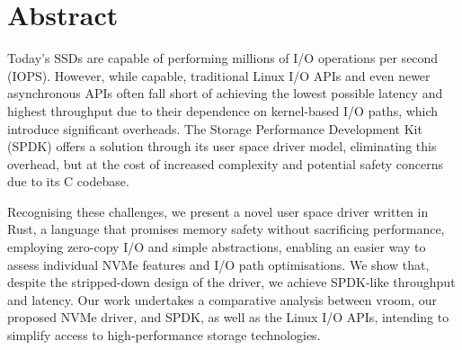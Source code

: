 \chapter{Abstract}
Today's SSDs are capable of performing millions of I/O operations per second (IOPS). However, while capable, traditional Linux I/O APIs and even newer asynchronous APIs often fall short of achieving the lowest possible latency and highest throughput due to their dependence on kernel-based I/O paths, which introduce significant overheads. The Storage Performance Development Kit (SPDK) offers a solution through its user space driver model, eliminating this overhead, but at the cost of increased complexity and potential safety concerns due to its C codebase.

Recognising these challenges, we present a novel user space driver written in Rust, a language that promises memory safety without sacrificing performance, employing zero-copy I/O and simple abstractions, enabling an easier way to assess individual NVMe features and I/O path optimisations. We show that, despite the stripped-down design of the driver, we achieve SPDK-like throughput and latency. Our work undertakes a comparative analysis between vroom, our proposed NVMe driver, and SPDK, as well as the Linux I/O APIs, intending to simplify access to high-performance storage technologies.
